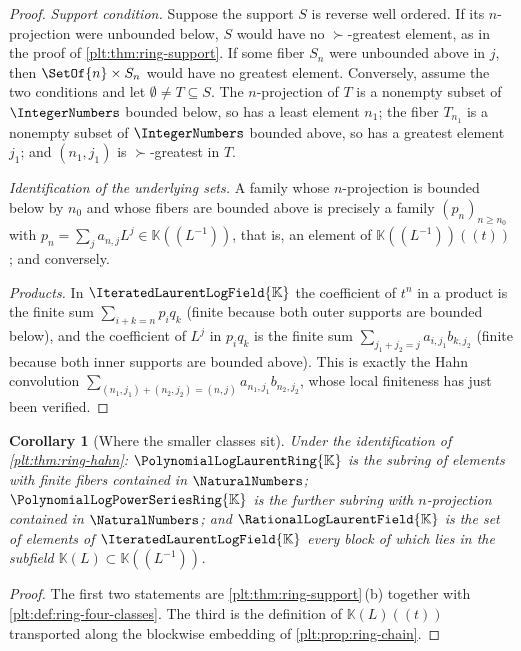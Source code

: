\documentclass[11pt,oneside]{article}
\theoremstyle{plain}
\newtheorem{corollary}[theorem]{Corollary}
\theoremstyle{definition}
\theoremstyle{remark}
\newcommand{\K}{\mathbb{K}}
\newcommand{\PLpow}{\PolynomialLogPowerSeriesRing{\K}}   %
\newcommand{\PLlau}{\PolynomialLogLaurentRing{\K}}       %
\newcommand{\PLrat}{\RationalLogLaurentField{\K}}        %
\newcommand{\PLit}{\IteratedLaurentLogField{\K}}         %
\newcommand{\succdom}{\succ}
\begin{document}
\begin{proof}
\emph{Support condition.}  Suppose the support \(S\) is reverse well ordered.
If its \(n\)-projection were unbounded below, \(S\) would have no
\(\succdom\)-greatest element, as in the proof of
\cref{plt:thm:ring-support}.  If some fiber \(S_n\) were unbounded above in
\(j\), then \(\SetOf{n}\times S_n\) would have no greatest element.
Conversely, assume the two conditions and let \(\emptyset\ne T\subseteq S\).
The \(n\)-projection of \(T\) is a nonempty subset of \(\IntegerNumbers\)
bounded below, so has a least element \(n_1\); the fiber \(T_{n_1}\) is a
nonempty subset of \(\IntegerNumbers\) bounded above, so has a greatest
element \(j_1\); and \((n_1,j_1)\) is \(\succdom\)-greatest in \(T\).

\emph{Identification of the underlying sets.}  A family whose \(n\)-projection
is bounded below by \(n_0\) and whose fibers are bounded above is precisely a
family \((p_n)_{n\ge n_0}\) with \(p_n=\sum_ja_{n,j}L^j\in\K((L^{-1}))\), that
is, an element of \(\K((L^{-1}))((t))\); and conversely.

\emph{Products.}  In \(\PLit\) the coefficient of \(t^n\) in a product is the
finite sum \(\sum_{i+k=n}p_iq_k\) (finite because both outer supports are
bounded below), and the coefficient of \(L^j\) in \(p_iq_k\) is the finite sum
\(\sum_{j_1+j_2=j}a_{i,j_1}b_{k,j_2}\) (finite because both inner supports are
bounded above).  This is exactly the Hahn convolution
\(\sum_{(n_1,j_1)+(n_2,j_2)=(n,j)}a_{n_1,j_1}b_{n_2,j_2}\), whose local
finiteness has just been verified.
\end{proof}

\begin{corollary}[Where the smaller classes sit]
\label{plt:cor:ring-hahn-subrings}
Under the identification of \cref{plt:thm:ring-hahn}:
\(\PLlau\) is the subring of elements with \emph{finite} fibers contained in
\(\NaturalNumbers\); \(\PLpow\) is the further subring with
\(n\)-projection contained in \(\NaturalNumbers\); and \(\PLrat\) is the set of
elements of \(\PLit\) \emph{every} block of which lies in the subfield
\(\K(L)\subset\K((L^{-1}))\).
\end{corollary}

\begin{proof}
The first two statements are \cref{plt:thm:ring-support}\,(b) together with
\cref{plt:def:ring-four-classes}.  The third is the definition of
\(\K(L)((t))\) transported along the blockwise embedding of
\cref{plt:prop:ring-chain}.
\end{proof}
\end{document}
